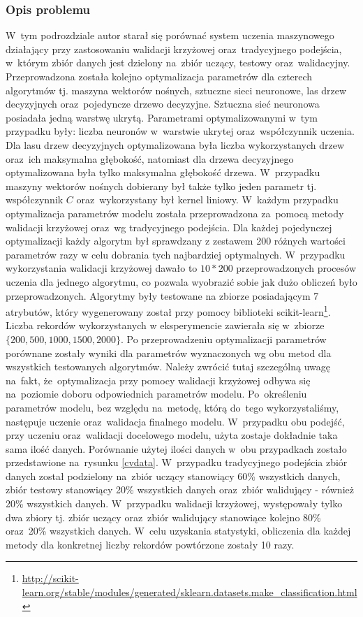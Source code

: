 \subsubsection{Opis problemu}
W~tym podrozdziale autor starał się porównać system uczenia maszynowego działający przy zastosowaniu walidacji krzyżowej oraz~tradycyjnego podejścia, w~którym zbiór danych jest dzielony na~zbiór uczący, testowy oraz~walidacyjny. Przeprowadzona została kolejno optymalizacja parametrów dla czterech algorytmów tj. maszyna wektorów nośnych, sztuczne sieci neuronowe, las drzew decyzyjnych oraz~pojedyncze drzewo decyzyjne. Sztuczna sieć neuronowa posiadała jedną warstwę ukrytą. Parametrami optymalizowanymi w~tym przypadku były: liczba neuronów w~warstwie ukrytej oraz~współczynnik uczenia. Dla lasu drzew decyzyjnych optymalizowana była liczba wykorzystanych drzew oraz~ich maksymalna głębokość, natomiast dla drzewa decyzyjnego optymalizowana była tylko maksymalna głębokość drzewa. W~przypadku maszyny wektorów nośnych dobierany był także tylko jeden parametr tj. współczynnik $C$ oraz~wykorzystany był kernel liniowy. W~każdym przypadku optymalizacja parametrów modelu została przeprowadzona za~pomocą metody walidacji krzyżowej oraz~wg tradycyjnego podejścia. Dla każdej pojedynczej optymalizacji każdy algorytm był sprawdzany z zestawem 200 różnych wartości parametrów razy w celu dobrania tych najbardziej optymalnych. W~przypadku wykorzystania walidacji krzyżowej dawało to $10*200$ przeprowadzonych procesów uczenia dla jednego algorytmu, co pozwala wyobrazić sobie jak dużo obliczeń było przeprowadzonych. Algorytmy były testowane na zbiorze posiadającym 7 atrybutów, który wygenerowany został przy pomocy biblioteki scikit-learn\footnote{\url{http://scikit-learn.org/stable/modules/generated/sklearn.datasets.make_classification.html}}. Liczba rekordów wykorzystanych w eksperymencie zawierała się w~zbiorze $ \{200, 500, 1000, 1500, 2000\}.$ Po przeprowadzeniu optymalizacji parametrów porównane zostały wyniki dla parametrów wyznaczonych wg obu metod dla wszystkich testowanych algorytmów. Należy zwrócić tutaj szczególną uwagę na~fakt, że~optymalizacja przy pomocy walidacji krzyżowej odbywa się na~poziomie doboru odpowiednich parametrów modelu. Po~określeniu parametrów modelu, bez względu na~metodę, którą do~tego wykorzystaliśmy, następuje uczenie oraz~walidacja finalnego modelu. W~przypadku obu podejść, przy uczeniu oraz~walidacji docelowego modelu, użyta zostaje dokładnie taka sama ilość danych. Porównanie użytej ilości danych w~obu przypadkach zostało przedstawione na~rysunku \ref{cvdata}. W~przypadku tradycyjnego podejścia zbiór danych został podzielony na~zbiór uczący stanowiący 60\% wszystkich danych, zbiór testowy stanowiący 20\% wszystkich danych oraz~zbiór walidujący - również 20\% wszystkich danych. W~przypadku walidacji krzyżowej, występowały tylko dwa zbiory tj. zbiór uczący oraz~zbiór walidujący stanowiące kolejno 80\% oraz~20\% wszystkich danych. W~celu uzyskania statystyki, obliczenia dla każdej metody dla konkretnej liczby rekordów powtórzone zostały 10 razy.

